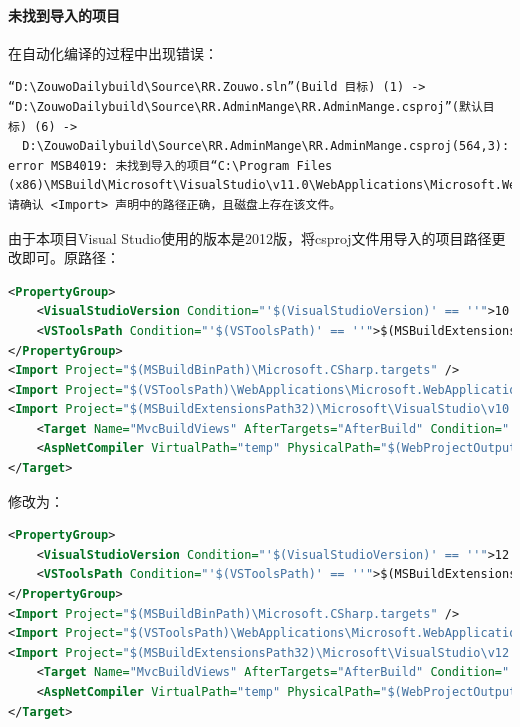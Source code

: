\documentclass{book}
\begin{document}
\paragraph{未找到导入的项目}在自动化编译的过程中出现错误：

\begin{lstlisting}
“D:\ZouwoDailybuild\Source\RR.Zouwo.sln”(Build 目标) (1) ->
“D:\ZouwoDailybuild\Source\RR.AdminMange\RR.AdminMange.csproj”(默认目标) (6) ->
  D:\ZouwoDailybuild\Source\RR.AdminMange\RR.AdminMange.csproj(564,3): error MSB4019: 未找到导入的项目“C:\Program Files (x86)\MSBuild\Microsoft\VisualStudio\v11.0\WebApplications\Microsoft.WebApplication.targets”。请确认 <Import> 声明中的路径正确，且磁盘上存在该文件。
\end{lstlisting}

由于本项目Visual Studio使用的版本是2012版，将csproj文件用导入的项目路径更改即可。原路径：

\begin{lstlisting}[language=XML]
<PropertyGroup>
	<VisualStudioVersion Condition="'$(VisualStudioVersion)' == ''">10.0</VisualStudioVersion>
	<VSToolsPath Condition="'$(VSToolsPath)' == ''">$(MSBuildExtensionsPath32)\Microsoft\VisualStudio\v$(VisualStudioVersion)</VSToolsPath>
</PropertyGroup>
<Import Project="$(MSBuildBinPath)\Microsoft.CSharp.targets" />
<Import Project="$(VSToolsPath)\WebApplications\Microsoft.WebApplication.targets" Condition="'$(VSToolsPath)' != ''" />
<Import Project="$(MSBuildExtensionsPath32)\Microsoft\VisualStudio\v10.0\WebApplications\Microsoft.WebApplication.targets" Condition="false" />
	<Target Name="MvcBuildViews" AfterTargets="AfterBuild" Condition="'$(MvcBuildViews)'=='true'">
	<AspNetCompiler VirtualPath="temp" PhysicalPath="$(WebProjectOutputDir)" />
</Target>
\end{lstlisting}

修改为：

\begin{lstlisting}[language=XML]
<PropertyGroup>
	<VisualStudioVersion Condition="'$(VisualStudioVersion)' == ''">12.0</VisualStudioVersion>
	<VSToolsPath Condition="'$(VSToolsPath)' == ''">$(MSBuildExtensionsPath32)\Microsoft\VisualStudio\v$(VisualStudioVersion)</VSToolsPath>
</PropertyGroup>
<Import Project="$(MSBuildBinPath)\Microsoft.CSharp.targets" />
<Import Project="$(VSToolsPath)\WebApplications\Microsoft.WebApplication.targets" Condition="'$(Solutions.VSVersion)' == '12.0'" />
<Import Project="$(MSBuildExtensionsPath32)\Microsoft\VisualStudio\v12.0\WebApplications\Microsoft.WebApplication.targets" Condition="'$(Solutions.VSVersion)' == '12.0'" />
	<Target Name="MvcBuildViews" AfterTargets="AfterBuild" Condition="'$(MvcBuildViews)'=='true'">
	<AspNetCompiler VirtualPath="temp" PhysicalPath="$(WebProjectOutputDir)" />
</Target>
\end{lstlisting}
\end{document}

